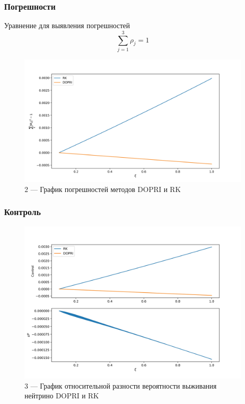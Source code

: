 \documentclass[utf8,9pt,mathserif,usepdftitle=false]{beamer}
\begin{document}
\begin{frame}
  \frametitle{Погрешности}%
Уравнение для выявления погрешностей
\begin{equation*}
   \sum_{j=1}^3\rho_j=1
  \end{equation*}
\begin{figure}[h!]
\centering

\includegraphics[width=0.8\linewidth]{1conrol_c.jpg}

\caption{2 — График погрешностей методов DOPRI и RK}

\label{fig:mpr}

\end{figure}
\end{frame}

\begin{frame}
  \frametitle{Контроль}%
\begin{figure}[h!]
\centering

\includegraphics[width=0.8\linewidth]{(pr2-pr1)pr2.jpg}

\caption{3 — График относительной разности вероятности выживания нейтрино DOPRI и RK}

\label{fig:mpr}

\end{figure}
\end{frame}
\end{document}
